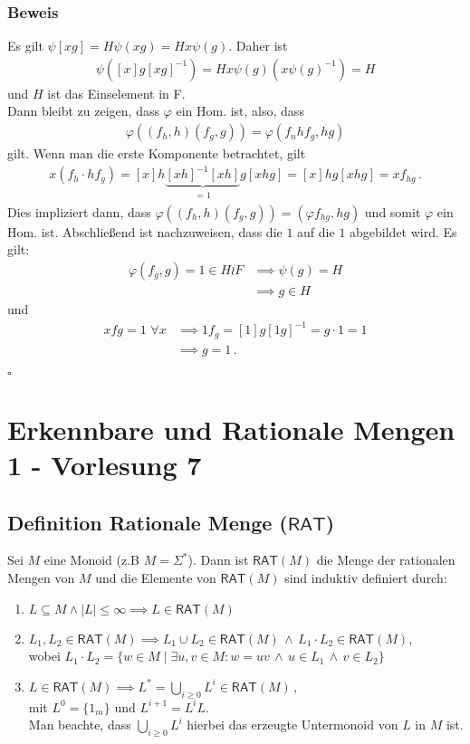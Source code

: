 \documentclass[12pt, german]{article}
\newcommand{\sigstern}{\Sigma^\ast}
\newcommand{\rat}{\mathsf{RAT}}
\newcommand{\bewiesen}{
	
	\begin{flushright}
		$\square$  \\
\end{flushright}}
\begin{document}
	\subsubsection{Beweis}
	Es gilt $\psi[xg] = H\psi(xg) = Hx\psi(g)$. Daher ist
	\begin{align*}
		\psi([x]g[xg]^{-1}) = Hx\psi(g)(x\psi(g)^{-1}) = H
	\end{align*}
	und $H$ ist das Einselement in F.\\
	Dann bleibt zu zeigen, dass $\varphi$ ein Hom. ist, also, dass
	\begin{align*}
		\varphi((f_h, h)(f_g, g)) = \varphi(f_nhf_g, hg) 
	\end{align*}
	gilt. Wenn man die erste Komponente betrachtet, gilt
	\begin{align*}
		x(f_h \cdot hf_g) = [x]h\underbrace{[xh]^{-1}[xh]}_{\substack{=1}}g[xhg] = [x]hg[xhg] = xf_{hg}\, .
	\end{align*}
	Dies impliziert dann, dass $\varphi((f_h, h)(f_g,g)) = (\varphi f_{hg}, hg)$ und somit $\varphi$ ein Hom. ist. 
	Abschlie\ss end ist nachzuweisen, dass die $1$ auf die $1$ abgebildet wird. Es gilt:
	\begin{align*}
		\varphi(f_g, g) = 1 \in H \wr F &\implies \psi(g) = H \\
		&\implies g \in H
	\end{align*}
	und
	\begin{align*}
		xfg = 1 \, \, \forall x &\implies 1f_g = [1]g[1g]^{-1} = g \cdot 1 = 1 \\
		&\implies g = 1\, .
	\end{align*}
	\bewiesen
	
	\section{Erkennbare und Rationale Mengen 1 - Vorlesung 7}
	\subsection{Definition Rationale Menge ($\rat$)}
	Sei $M$ eine Monoid (z.B $M = \sigstern$).
	Dann ist $\rat(M)$ die Menge der rationalen Mengen von $M$ und die Elemente von $\rat(M)$ sind induktiv definiert durch:
	\begin{enumerate}[label=\arabic*)]
		\item $L \subseteq M \wedge |L| \leq \infty \implies L \in \rat(M)$
		\item $L_1, L_2 \in \rat(M) \implies L_1 \cup L_2 \in \rat(M) \, \wedge \, L_1 \cdot L_2 \in \rat(M)$, \\ 
		wobei $ L_1 \cdot L_2 = \{w \in M \mid \exists u,v \in M : w = uv \, \wedge \, u \in L_1 \,\wedge\, v \in L_2\}$
		\item $L \in \rat(M) \implies L^\ast = \bigcup_{i \geq 0} L^i \in \rat(M)\,,$\\
		mit $L^0=\{1_m\}$ und $L^{i+1} = L^iL$.\\ \newline
		Man beachte, dass $\bigcup_{i \geq 0} L^i $ hierbei das erzeugte Untermonoid von $L$ in $M$ ist.
	\end{enumerate}
	
\end{document}
